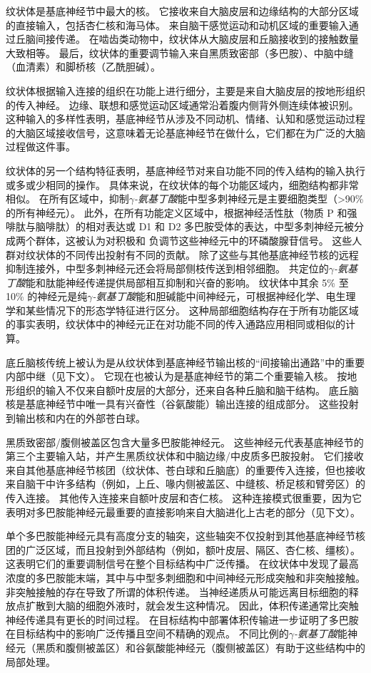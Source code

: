 纹状体是基底神经节中最大的核。
它接收来自大脑皮层和边缘结构的大部分区域的直接输入，包括杏仁核和海马体。
来自脑干感觉运动和动机区域的重要输入通过丘脑间接传递。
在啮齿类动物中，纹状体从大脑皮层和丘脑接收到的接触数量大致相等。
最后，纹状体的重要调节输入来自黑质致密部（多巴胺）、中脑中缝（血清素）和脚桥核（乙酰胆碱）。


纹状体根据输入连接的组织在功能上进行细分，主要是来自大脑皮层的按地形组织的传入神经。
边缘、联想和感觉运动区域通常沿着腹内侧背外侧连续体被识别。
这种输入的多样性表明，基底神经节从涉及不同动机、情绪、认知和感觉运动过程的大脑区域接收信号，这意味着无论基底神经节在做什么，它们都在为广泛的大脑过程做这件事。


纹状体的另一个结构特征表明，基底神经节对来自功能不同的传入结构的输入执行或多或少相同的操作。
具体来说，在纹状体的每个功能区域内，细胞结构都非常相似。
在所有区域中，抑制\textit{$\gamma$-氨基丁酸}能中型多刺神经元是主要细胞类型（>90\% 的所有神经元）。
此外，在所有功能定义区域中，根据神经活性肽（物质 P 和强啡肽与脑啡肽）的相对表达或 D1 和 D2 多巴胺受体的表达，中型多刺神经元被分成两个群体，这被认为对积极和 负调节这些神经元中的环磷酸腺苷信号。
这些人群对纹状体的不同传出投射有不同的贡献。
除了这些与其他基底神经节核的远程抑制连接外，中型多刺神经元还会将局部侧枝传送到相邻细胞。
共定位的\textit{$\gamma$-氨基丁酸}能和肽能神经传递提供局部相互抑制和兴奋的影响。
纹状体中其余 5\% 至 10\% 的神经元是纯\textit{$\gamma$-氨基丁酸}能和胆碱能中间神经元，可根据神经化学、电生理学和某些情况下的形态学特征进行区分。
这种局部细胞结构存在于所有功能区域的事实表明，纹状体中的神经元正在对功能不同的传入通路应用相同或相似的计算。


底丘脑核传统上被认为是从纹状体到基底神经节输出核的“间接输出通路”中的重要内部中继（见下文）。
它现在也被认为是基底神经节的第二个重要输入核。
按地形组织的输入不仅来自额叶皮层的大部分，还来自各种丘脑和脑干结构。
底丘脑核是基底神经节中唯一具有兴奋性（谷氨酸能）输出连接的组成部分。
这些投射到输出核和内在的外部苍白球。


黑质致密部/腹侧被盖区包含大量多巴胺能神经元。
这些神经元代表基底神经节的第三个主要输入站，并产生黑质纹状体和中脑边缘/中皮质多巴胺投射。
它们接收来自其他基底神经节核团（纹状体、苍白球和丘脑底）的重要传入连接，但也接收来自脑干中许多结构（例如，上丘、喙内侧被盖区、中缝核、桥足核和臂旁区）的传入连接。
其他传入连接来自额叶皮层和杏仁核。
这种连接模式很重要，因为它表明对多巴胺能神经元最重要的直接影响来自大脑进化上古老的部分（见下文）。


单个多巴胺能神经元具有高度分支的轴突，这些轴突不仅投射到其他基底神经节核团的广泛区域，而且投射到外部结构（例如，额叶皮层、隔区、杏仁核、缰核）。
这表明它们的重要调制信号在整个目标结构中广泛传播。 在纹状体中发现了最高浓度的多巴胺能末端，其中与中型多刺细胞和中间神经元形成突触和非突触接触。
非突触接触的存在导致了所谓的体积传递。
当神经递质从可能远离目标细胞的释放点扩散到大脑的细胞外液时，就会发生这种情况。
因此，体积传递通常比突触神经传递具有更长的时间过程。
在目标结构中部署体积传输进一步证明了多巴胺在目标结构中的影响广泛传播且空间不精确的观点。
不同比例的\textit{$\gamma$-氨基丁酸}能神经元（黑质和腹侧被盖区）和谷氨酸能神经元（腹侧被盖区）有助于这些结构中的局部处理。



